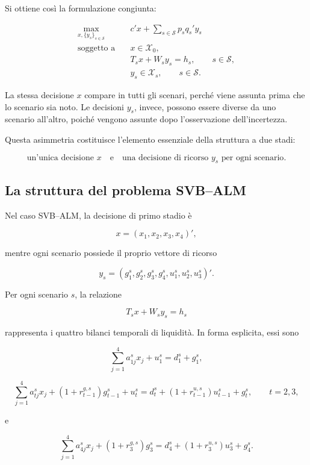 Si ottiene cos\`{i} la formulazione congiunta:



\begin{equation}
\begin{aligned}
\max_{x,\{y_s\}_{s\in\mathcal S}}
\quad&
c'x+
\sum_{s\in\mathcal S}p_s q_s'y_s
\\
\text{soggetto a}\quad&
x\in\mathcal X_0,
\\
&
T_sx+W_sy_s=h_s,
\qquad s\in\mathcal S,
\\
&
y_s\in\mathcal X_s,
\qquad s\in\mathcal S.
\end{aligned}
\label{eq:cap14-programma-stocastico-lineare}
\end{equation}

La stessa decisione $x$ compare in tutti gli scenari, perch\'e viene assunta
prima che lo scenario sia noto. Le decisioni $y_s$, invece, possono essere
diverse da uno scenario all'altro, poich\'e vengono assunte dopo
l'osservazione dell'incertezza.

Questa asimmetria costituisce l'elemento essenziale della struttura a due
stadi:

\[
\boxed{
\text{un'unica decisione }x
\quad\text{e}\quad
\text{una decisione di ricorso }y_s\text{ per ogni scenario}.
}
\]

\subsection{La struttura del problema SVB--ALM}

Nel caso SVB--ALM, la decisione di primo stadio \`e

\[
x=
(x_1,x_2,x_3,x_4)',
\]

\noindent mentre ogni scenario possiede il proprio vettore di ricorso

\[
y_s=
(g_1^s,g_2^s,g_3^s,g_4^s,
u_1^s,u_2^s,u_3^s)'.
\]

Per ogni scenario $s$, la relazione

\[
T_sx+W_sy_s=h_s
\]

\noindent rappresenta i quattro bilanci temporali di liquidit\`a. In forma esplicita,
essi sono

\[
\sum_{j=1}^{4}a_{1j}^s x_j+u_1^s
=
d_1^s+g_1^s,
\]

\[
\sum_{j=1}^{4}a_{tj}^s x_j
+
(1+r_{t-1}^{g,s})g_{t-1}^s
+
u_t^s
=
d_t^s
+
(1+r_{t-1}^{u,s})u_{t-1}^s
+
g_t^s,
\qquad t=2,3,
\]

e

\[
\sum_{j=1}^{4}a_{4j}^s x_j
+
(1+r_3^{g,s})g_3^s
=
d_4^s
+
(1+r_3^{u,s})u_3^s
+
g_4^s.
\]

